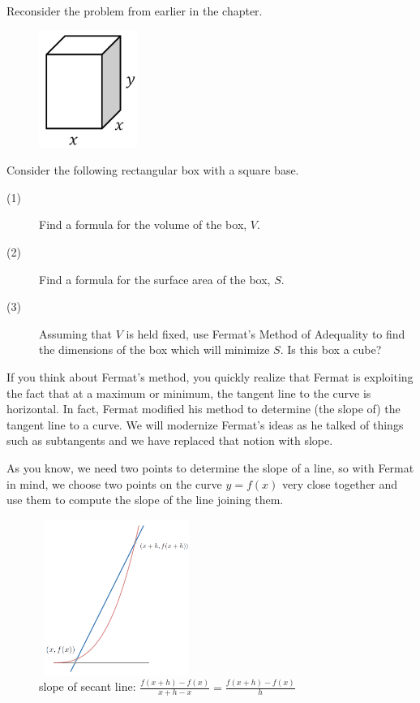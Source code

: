 Reconsider the problem from earlier in the chapter.

\begin{embeddedproblem}{}
\begin{figure}
\captionsetup{labelformat=empty}
\includegraphics*[height=1.5in,width=.75in]{Figures/RectSolid}
\label{fig:RectSolid}
\end{figure}
  Consider the following rectangular box with a square base.\\
  \begin{description}
  \item[(1)] Find a formula for the volume of the box, $V.$
  \item[(2)] Find a formula for the surface area of the box, $S.$
  \item[(3)] 	Assuming that $V$ is held fixed, use Fermat's Method
    of Adequality to find the dimensions of the box which will
    minimize $S.$  Is this box a cube?    
  \end{description}
\end{embeddedproblem}

If you think about Fermat's method, you quickly realize that Fermat is
exploiting the fact that at a maximum or minimum, the tangent line to
the curve is horizontal.  In fact, Fermat modified his method to
determine (the slope of) the tangent line to a curve.  We will
modernize Fermat's ideas as he talked of things such as subtangents
and we have replaced that notion with slope. 

As you know, we need two points to determine the slope of a line, so
with Fermat in mind, we choose two points on the curve $y=f(x)$ very
close together and use them to compute the slope of the line joining
them.

\begin{figure}
\captionsetup{labelformat=empty}
\centerline{\includegraphics*[height=2in,width=2in]{Figures/Aedequality1}}
\caption{slope of secant line: $\frac{f(x+h)-f(x)}{x+h-x} = \frac{f(x+h)-f(x)}{h}$}
\label{fig:}
\end{figure}

